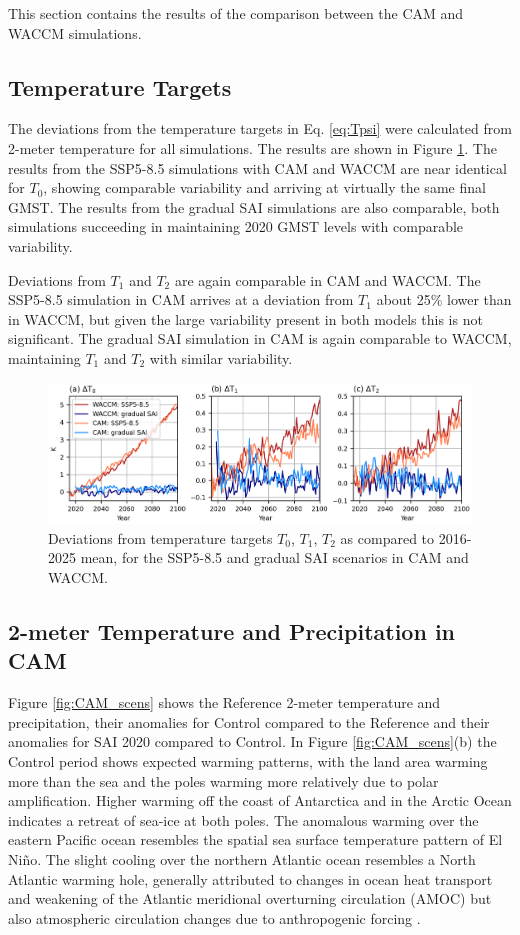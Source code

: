 This section contains the results of the comparison between the CAM and WACCM simulations. 

\subsection{Temperature Targets}
The deviations from the temperature targets in Eq. \ref{eq:Tpsi} were calculated from 2-meter temperature for all simulations. The results are shown in Figure \ref{fig:Tgrad1}. The results from the SSP5-8.5 simulations with CAM and WACCM are near identical for $T_0$, showing comparable variability and arriving at virtually the same final GMST. The results from the gradual SAI simulations are also comparable, both simulations succeeding in maintaining 2020 GMST levels with comparable variability. 

Deviations from $T_1$ and $T_2$ are again comparable in CAM and WACCM. The SSP5-8.5 simulation in CAM arrives at a deviation from $T_1$ about 25\% lower than in WACCM, but given the large variability present in both models this is not significant. The gradual SAI simulation in CAM is again comparable to WACCM, maintaining $T_1$ and $T_2$ with similar variability. 

\begin{figure}[H]
	\centering
	\includegraphics[width=0.95\linewidth]{images/Tgrad_v.png}
	\caption{Deviations from temperature targets $T_0$, $T_1$, $T_2$ as compared to 2016-2025 mean, for the SSP5-8.5 and gradual SAI scenarios in CAM and WACCM.}
	\label{fig:Tgrad1}
\end{figure}


\subsection{2-meter Temperature and Precipitation in CAM}
Figure \ref{fig:CAM_scens} shows the Reference 2-meter temperature and precipitation, their anomalies for Control compared to the Reference and their anomalies for SAI 2020 compared to Control. In Figure \ref{fig:CAM_scens}(b) the Control period shows expected warming patterns, with the land area warming more than the sea and the poles warming more relatively due to polar amplification. Higher warming off the coast of Antarctica and in the Arctic Ocean indicates a retreat of sea-ice at both poles. The anomalous warming over the eastern Pacific ocean resembles the spatial sea surface temperature pattern of El Ni\~no. The slight cooling over the northern Atlantic ocean resembles a North Atlantic warming hole, generally attributed to changes in ocean heat transport and weakening of the Atlantic meridional overturning circulation (AMOC) but also atmospheric circulation changes due to anthropogenic forcing \parencite{menary2018anatomy,he2022}. 

